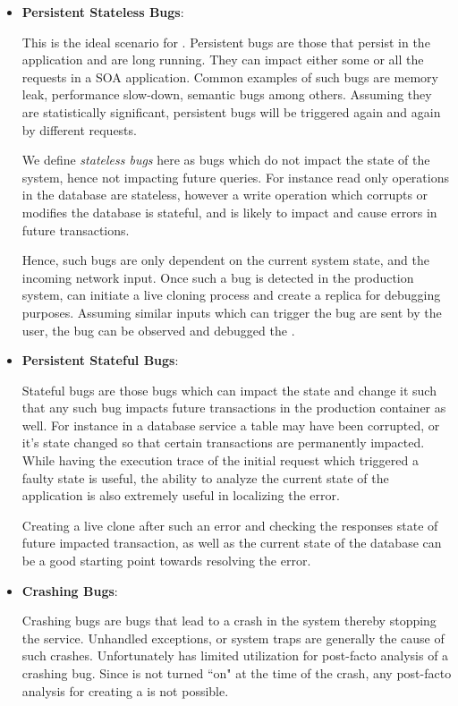 \begin{itemize}
	
	\item \textbf{Persistent Stateless Bugs}: 
	
	This is the ideal scenario for \parikshan.
	Persistent bugs are those that persist in the application and are long running. 
	They can impact either some or all the requests in a SOA application.
	Common examples of such bugs are memory leak, performance slow-down, semantic bugs among others.
	Assuming they are statistically significant, persistent bugs will be triggered again and again by different requests.
	
	We define \emph{stateless bugs} here as bugs which do not impact the state of the system, hence not impacting future queries. 
	For instance read only operations in the database are stateless, however a write operation which corrupts or modifies the database is stateful, and is likely to impact and cause errors in future transactions.
	
	Hence, such bugs are only dependent on the current system state, and the incoming network input.
	Once such a bug is detected in the production system, \parikshan can initiate a live cloning process and create a replica for debugging purposes. 
	Assuming similar inputs which can trigger the bug are sent by the user, the bug can be observed and debugged the \debugcontainer.
	
	\item \textbf{Persistent Stateful Bugs}:
	
	Stateful bugs are those bugs which can impact the state and change it such that any such bug impacts future transactions in the production container as well.
	For instance in a database service a table may have been corrupted, or it's state changed so that certain transactions are permanently impacted. 
	While having the execution trace of the initial request which triggered a faulty state is useful, the ability to analyze the current state of the application is also extremely useful in localizing the error.
	
	Creating a live clone after such an error and checking the responses state of future impacted transaction, as well as the current state of the database can be a good starting point towards resolving the error. 
	
	\item \textbf{Crashing Bugs}: 
	
	Crashing bugs are bugs that lead to a crash in the system thereby stopping the service.
	Unhandled exceptions, or system traps are generally the cause of such crashes.
	Unfortunately \parikshan has limited utilization for post-facto analysis of a crashing bug. 
	Since \parikshan is not turned ``on" at the time of the crash, any post-facto analysis for creating a \debugcontainer is not possible.

	
\end{itemize} 

